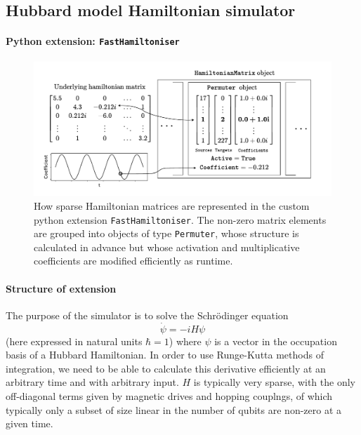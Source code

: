 \documentclass{report}
\begin{document}
\begin{appendices}
\chapter{Hubbard model Hamiltonian simulator}\label{appendix:software}

\subsubsection{Python extension: \texttt{FastHamiltoniser}}
\begin{figure}[ht]
    \centering
    \includegraphics[scale = 0.8]{Figures/fasthamiltoniser/diagram.pdf}
    \caption{How sparse Hamiltonian matrices are represented in the custom python extension \texttt{FastHamiltoniser}. The non-zero matrix elements are grouped into objects of type \texttt{Permuter}, whose structure is calculated in advance but whose activation and multiplicative coefficients are modified efficiently as runtime.}
    \label{fig:fasthamiltoniser}
\end{figure}
\subsubsection{Structure of extension}
The purpose of the simulator is to solve the Schrödinger equation
\begin{equation} \label{eq:schrodinger}
    \dot{\psi} = -i H \psi 
\end{equation} (here expressed in natural units $\hbar = 1$) where $\psi$ is a vector in the occupation basis of a Hubbard Hamiltonian. In order to use Runge-Kutta \cite{Butcher1996} methods of integration, we need to be able to calculate this derivative efficiently at an arbitrary time and with arbitrary input. $H$ is typically very sparse, with the only off-diagonal terms given by magnetic drives and hopping couplngs, of which typically only a subset of size linear in the number of qubits are non-zero at a given time. 


\end{appendices}
\end{document}
